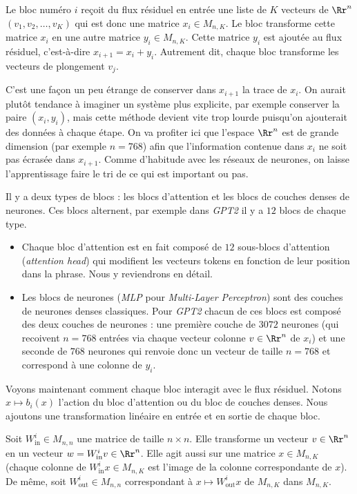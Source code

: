 \documentclass[11pt,class=report,crop=false]{standalone}
\begin{document}
Le bloc numéro $i$ reçoit du flux résiduel en entrée une liste de $K$ vecteurs de $\Rr^n$ $(v_1,v_2, \ldots,v_K)$ qui est donc une matrice $x_i \in M_{n,K}$.
Le bloc transforme cette matrice $x_i$ en une autre matrice $y_i \in M_{n,K}$. Cette matrice $y_i$ est ajoutée au flux résiduel, c'est-à-dire $x_{i+1} = x_i + y_i$.
Autrement dit, chaque bloc transforme les vecteurs de plongement $v_j$. 



C'est une façon un peu étrange de conserver dans $x_{i+1}$ la trace de $x_i$. On aurait plutôt tendance à imaginer un système plus explicite, par exemple conserver la paire $(x_i,y_i)$, mais cette méthode devient vite trop lourde puisqu'on ajouterait des données à chaque étape. On va profiter ici que l'espace $\Rr^n$ est de grande dimension (par exemple $n=768$) afin que l'information contenue dans $x_i$ ne soit pas écrasée dans $x_{i+1}$. Comme d'habitude avec les réseaux de neurones, on laisse l'apprentissage faire le tri de ce qui est important ou pas.

Il y a deux types de blocs : les blocs d'attention et les blocs de couches denses de neurones. Ces blocs alternent, par exemple dans \emph{GPT2} il y a $12$ blocs de chaque type.
\begin{itemize}
	\item Chaque bloc d'attention est en fait composé de $12$ sous-blocs d'attention (\emph{attention head}) qui modifient les vecteurs tokens en fonction de leur position dans la phrase. Nous y reviendrons en détail.
	
	\item Les blocs de neurones (\emph{MLP} pour \emph{Multi-Layer Perceptron}) sont des couches de neurones denses classiques. Pour \emph{GPT2} chacun de ces blocs est composé des deux couches de neurones : une première couche de $3072$ neurones (qui recoivent $n=768$ entrées via chaque vecteur colonne $v \in \Rr^n$ de $x_i$) et une seconde de $768$ neurones qui renvoie donc un vecteur de taille $n=768$ et correspond à une colonne de $y_i$.
	
\end{itemize}


Voyons maintenant comment chaque bloc interagit avec le flux résiduel.
Notons $x \mapsto b_i(x)$ l'action du bloc d'attention ou du bloc de couches denses.
Nous ajoutons une transformation linéaire en entrée et en sortie de chaque bloc.

Soit $W_{\text{in}}^i \in M_{n,n}$ une matrice de taille $n \times n$. Elle transforme un vecteur $v \in \Rr^n$ en un vecteur $w = W_{\text{in}}^i v \in \Rr^n$.
Elle agit aussi sur une matrice $x \in M_{n,K}$ (chaque colonne de $W_{\text{in}}^i x \in M_{n,K}$ est l'image de la colonne correspondante de $x$).
De même, soit $W_{\text{out}}^i \in M_{n,n}$ correspondant à $x \mapsto W_{\text{out}}^i x$ de $M_{n,K}$ dans $M_{n,K}$.
\end{document}
